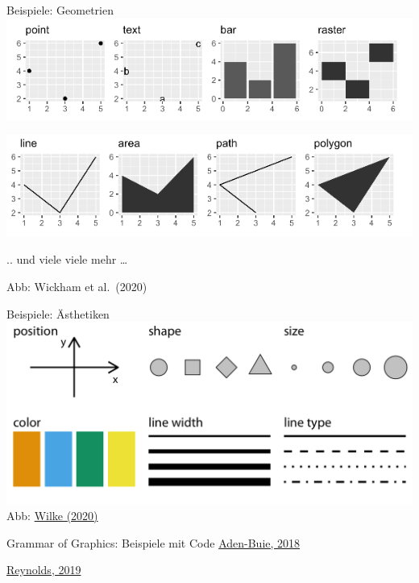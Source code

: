 \documentclass[
  10pt,
  ignorenonframetext,
]{beamer}
\begin{document}
\begin{frame}{Beispiele: Geometrien}
\label{beispiele-geometrien}
\includegraphics{pics/02-geoms1.png}

\includegraphics{pics/02-geoms2.png}

.. und viele viele mehr \ldots{}

\footnotesize

Abb: Wickham et al.~(2020)
\end{frame}

\begin{frame}{Beispiele: Ästhetiken}
\label{beispiele-uxe4sthetiken}
\includegraphics{pics/02-aesthetics.png}\\
\footnotesize Abb:
\href{https://clauswilke.com/dataviz/aesthetic_mapping_files/figure-html/common-aesthetics-1.png}{Wilke
(2020)}
\end{frame}

\begin{frame}{Grammar of Graphics: Beispiele mit Code}
\label{grammar-of-graphics-beispiele-mit-code}
\href{https://pkg.garrickadenbuie.com/gentle-ggplot2/\#68}{Aden-Buie,
2018}

\href{https://evamaerey.github.io/ggplot2_grammar_guide/ggplot2_grammar_guide.html\#30}{Reynolds,
2019}
\end{frame}
\end{document}
